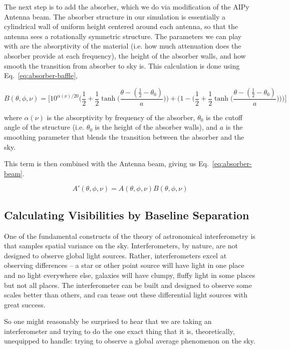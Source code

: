 The next step is to add the absorber, which we do via modification of the AIPy 
Antenna beam. The absorber structure in our simulation is essentially a 
cylindrical wall of uniform height centered around each antenna, so that the 
antenna sees a rotationally symmetric structure. The parameters we can play 
with are the absorptivity of the material (i.e. how much attenuation does the 
absorber provide at each frequency), the height of the absorber walls, and how 
smooth the transition from absorber to sky is. This calculation is done using 
Eq.~\eqref{eq:absorber-baffle},

\begin{equation}
    \label{eq:absorber-baffle}
    B(\theta, \phi, \nu) = \Big[10^{\alpha(\nu)/20} \Big(\frac{1}{2} + 
    \frac{1}{2} \tanh\Big(\frac{\theta - (\frac{1}{2} - 
    \theta_{0})}{a}\Big)\Big) + \Big(1 - \Big(\frac{1}{2} + \frac{1}{2} 
    \tanh\Big(\frac{\theta - (\frac{1}{2} - \theta_{0})}{a}\Big)\Big)\Big)\Big]
\end{equation}

where $\alpha(\nu)$ is the absorptivity by frequency of the absorber, 
$\theta_0$ is the cutoff angle of the structure (i.e. $\theta_0$ is the height 
of the absorber walls), and $a$ is the smoothing parameter that blends the 
transition between the absorber and the sky.

This term is then combined with the Antenna beam, giving us 
Eq.~\eqref{eq:absorber-beam}.

\begin{equation}
    \label{eq:absorber-beam}
    A'(\theta, \phi, \nu) = A(\theta, \phi, \nu) B(\theta, \phi, \nu)
\end{equation}

\subsection{Calculating Visibilities by Baseline Separation}

One of the fundamental constructs of the theory of astronomical interferometry 
is that samples spatial variance on the sky. Interferometers, by nature, are 
not designed to observe global light sources. Rather, interferometers excel at 
observing differences -- a star or other point source will have light in one 
place and no light everywhere else, galaxies will have clumpy, fluffy light in 
some places but not all places. The interferometer can be built and designed to 
observe some scales better than others, and can tease out these differential 
light sources with great success.

So one might reasonably be surprised to hear that we are taking an 
interferometer and trying to do the one exact thing that it is, theoretically, 
unequipped to handle: trying to observe a global average phenomenon on the sky.


